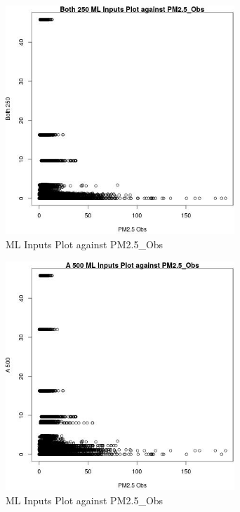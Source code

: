 \begin{figure} 
\centering  
\includegraphics[width=0.77\textwidth]{Code_Outputs/Report_ML_input_PM25_Step4_part_e_de_duplicated_aves_Both_250vPM25_Obs.jpg} 
\caption{\label{fig:Report_ML_input_PM25_Step4_part_e_de_duplicated_avesBoth_250vPM25_Obs}ML Inputs Plot against PM2.5_Obs} 
\end{figure} 
 

\clearpage 

\begin{figure} 
\centering  
\includegraphics[width=0.77\textwidth]{Code_Outputs/Report_ML_input_PM25_Step4_part_e_de_duplicated_aves_A_500vPM25_Obs.jpg} 
\caption{\label{fig:Report_ML_input_PM25_Step4_part_e_de_duplicated_avesA_500vPM25_Obs}ML Inputs Plot against PM2.5_Obs} 
\end{figure} 
 

